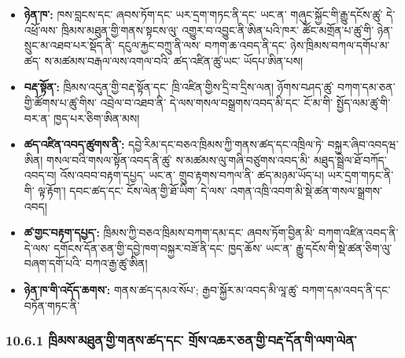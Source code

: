 \documentclass[11pt]{article}
\begin{document}
\begin{itemize}[leftmargin=*]
\item \textbf{ཉེན་ཁ་:} ཁས་བླངས་དང་ ཞབས་ཏོག་དང་ ཡར་དྲག་གཏང་ནི་དང་ ཡང་ན་ གཞུང་སྐྱོང་གི་རྒྱུ་དངོས་ཚུ་ དེ་འཕྲོ་ལས་ ཁྲིམས་མཐུན་གྱི་གནས་སྟངས་ལུ་ འགྱུར་བ་འབྱུང་ནི་ཨིན་པའི་ཁར་ ཚོང་མགྲོན་པ་ཚུ་གི་ ཉེན་སྲུང་མ་འཐབ་པར་སྡོད་ནི་ དངུལ་རྐྱང་བཀྲུ་ནི་ལས་ བཀག་ཆ་འབད་ནི་དང་ ཉེས་ཁྲིམས་བཀལ་དགོཔ་མ་ཚད་ ས་མཚམས་བརྒལ་ལས་འགལ་བའི་ ཚད་འཛིན་ཚུ་ཡང་ ཡོདཔ་ཨིན་པས།
\item \textbf{བརྡ་སྟོན་:} ཁྲིམས་འདུན་གྱི་བརྡ་སྟོན་དང་ ཁྲི་འཛིན་གྱིས་དྲི་བ་དྲིས་ལན། ཉོགས་བཤད་ཚུ་ བཀག་དམ་ཅན་གྱི་ཚོགས་པ་ཚུ་གིས་ འབྲེལ་བ་འཐབ་ནི་ དེ་ལས་གསལ་བསྒྲགས་འབད་མི་དང་ ངོ་མ་གི་ སྤྱོད་ལམ་ཚུ་གི་བར་ན་ ཁྱད་པར་ཅིག་ཨིན་མས།
\item \textbf{ཚད་འཛིན་འབད་ཚུགས་ནི་:} དབྱེ་རིམ་དང་བཅའ་ཁྲིམས་ཀྱི་གནས་ཚད་དང་འཁྲིལ་ཏེ་ བསྐྱར་ཞིབ་འབདཝ་ཨིན། གསལ་བའི་གསལ་སྟོན་འབད་ནི་ཚུ་ ས་མཚམས་ལུ་གཞི་བཙུགས་འབད་མི་ མཐུད་སྦྲེལ་ཐོ་བཀོད་འབད་བ། འོས་འབབ་བརྟག་དཔྱད་ ཡང་ན་ གྲུབ་རྟགས་བཀལ་ནི་ ཚད་མཉམ་ཡོད་པ། ཡར་དྲག་གཏང་ནི་གི་ ལྟ་རྟོག་། དབང་ཚད་དང་ ངོས་ལེན་གྱི་ཐོ་ཡིག་ དེ་ལས་ འགན་འཁྲི་འབག་མི་སྡེ་ཚན་གསལ་སྒྲགས་འབད།
\item \textbf{ཚ་གྱང་བརྟག་དཔྱད་:} ཁྲིམས་ཀྱི་བཅའ་ཁྲིམས་བཀག་དམ་དང་ ཞབས་ཏོག་བྱིན་མི་ བཀག་འཛིན་འབད་ནི་ དེ་ལས་ དགོངས་དོན་ཅན་གྱི་དབྱེ་ཁག་བསྐྱར་བཟོ་ནི་དང་ ཁྱད་ཆོས་ ཡང་ན་ རྒྱུ་དངོས་གི་སྡེ་ཚན་ཅིག་ལུ་ བཞག་དགོ་པའི་ བཀའ་རྒྱ་ཚུ་ཨིན།
\item \textbf{ཉེན་ཁ་གི་འདོད་ཆགས་:} གནས་ཚད་དམའ་སོཔ་; རྒྱབ་སྐྱོར་མ་འབད་མི་ལཱ་ཚུ་ བཀག་དམ་འབད་ནི་དང་ བཏོན་གཏང་ནི་
\end{itemize}
\subsubsection*{10.6.1 ཁྲིམས་མཐུན་གྱི་གནས་ཚད་དང་ གྲོས་འཆར་ཅན་གྱི་བརྡ་དོན་གི་ལག་ལེན་}
\end{document}
